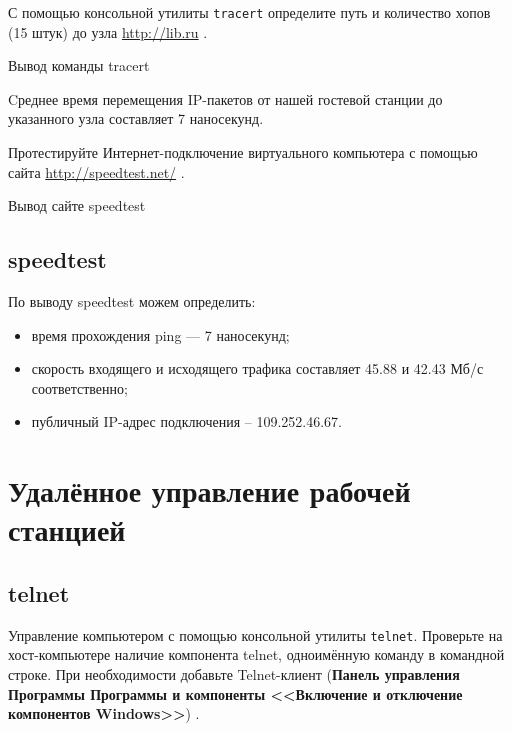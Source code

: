 С помощью консольной утилиты \texttt{tracert} определите путь
и количество хопов (15 штук) до узла \url{http://lib.ru}
.

\begin{image}
	\caption{Вывод команды tracert}
	\label{fig:tracert}
\end{image}

Cреднее время перемещения IP-пакетов от нашей гостевой станции
до указанного узла составляет 7 наносекунд.


Протестируйте Интернет-подключение виртуального компьютера с помощью сайта
\url{http://speedtest.net/} .

\begin{image}
	\caption{Вывод сайте speedtest}
	\label{fig:speedtest}
\end{image}

\subsection{speedtest}

По выводу speedtest можем определить:

\begin{itemize}
	\item время прохождения ping --- 7 наносекунд;
	\item скорость входящего и исходящего трафика
		составляет 45.88 и 42.43 Мб/с соответственно;
	\item публичный IP-адрес подключения -- 109.252.46.67.
\end{itemize}

\section{Удалённое управление рабочей станцией}

\subsection{telnet}

Управление компьютером с помощью консольной утилиты \texttt{telnet}.
Проверьте на хост-компьютере наличие компонента telnet, одноимённую команду
в командной строке. При необходимости добавьте Telnet-клиент
(\textbf{Панель управления \rarrow Программы \rarrow Программы и компоненты
\rarrow <<Включение и отключение компонентов Windows>>})
.

